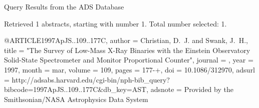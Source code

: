 Query Results from the ADS Database


Retrieved 1 abstracts, starting with number 1.  Total number selected: 1.

@ARTICLE{1997ApJS..109..177C,
   author = {{Christian}, D.~J. and {Swank}, J.~H.},
    title = "{The Survey of Low-Mass X-Ray Binaries with the Einstein Observatory Solid-State Spectrometer and Monitor Proportional Counter}",
  journal = {\apjs},
     year = 1997,
    month = mar,
   volume = 109,
    pages = {177-+},
      doi = {10.1086/312970},
   adsurl = {http://adsabs.harvard.edu/cgi-bin/nph-bib_query?bibcode=1997ApJS..109..177C&db_key=AST},
  adsnote = {Provided by the Smithsonian/NASA Astrophysics Data System}
}


